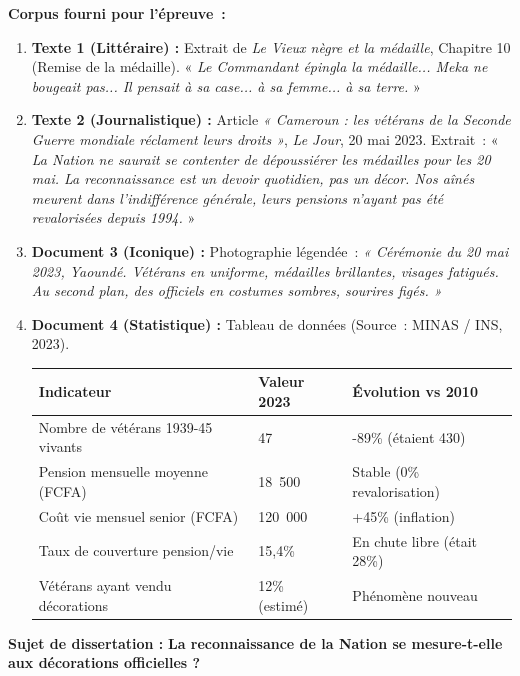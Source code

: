 \documentclass[11pt]{article}
\begin{document}
\noindent \textbf{Corpus fourni pour l'épreuve~:}
\begin{enumerate}
    \item \textbf{Texte 1 (Littéraire) :} Extrait de \emph{Le Vieux nègre et la médaille}, Chapitre 10 (Remise de la médaille). « \emph{Le Commandant épingla la médaille... Meka ne bougeait pas... Il pensait à sa case... à sa femme... à sa terre.} »
    \item \textbf{Texte 2 (Journalistique) :} Article \emph{« Cameroun : les vétérans de la Seconde Guerre mondiale réclament leurs droits »}, \emph{Le Jour}, 20 mai 2023. Extrait~: « \emph{La Nation ne saurait se contenter de dépoussiérer les médailles pour les 20 mai. La reconnaissance est un devoir quotidien, pas un décor. Nos aînés meurent dans l'indifférence générale, leurs pensions n'ayant pas été revalorisées depuis 1994.} »
    \item \textbf{Document 3 (Iconique) :} Photographie légendée~: \emph{« Cérémonie du 20 mai 2023, Yaoundé. Vétérans en uniforme, médailles brillantes, visages fatigués. Au second plan, des officiels en costumes sombres, sourires figés. »}
    \item \textbf{Document 4 (Statistique) :} Tableau de données (Source~: MINAS / INS, 2023).
    \begin{center}
    \begin{tabularx}{\linewidth}{|l|X|X|}\hline
    \rowcolor{popblueL} \textbf{Indicateur} & \textbf{Valeur 2023} & \textbf{Évolution vs 2010} \\ \hline
    Nombre de vétérans 1939-45 vivants & 47 & -89\% (étaient 430) \\ \hline
    Pension mensuelle moyenne (FCFA) & 18~500 & Stable (0\% revalorisation) \\ \hline
    Coût vie mensuel senior (FCFA) & 120~000 & +45\% (inflation) \\ \hline
    Taux de couverture pension/vie & 15,4\% & En chute libre (était 28\%) \\ \hline
    Vétérans ayant vendu décorations & 12\% (estimé) & Phénomène nouveau \\ \hline
    \end{tabularx}
    \end{center}
\end{enumerate}

\noindent \textbf{Sujet de dissertation :} \og \textbf{La reconnaissance de la Nation se mesure-t-elle aux décorations officielles ?} \fg
\end{document}
